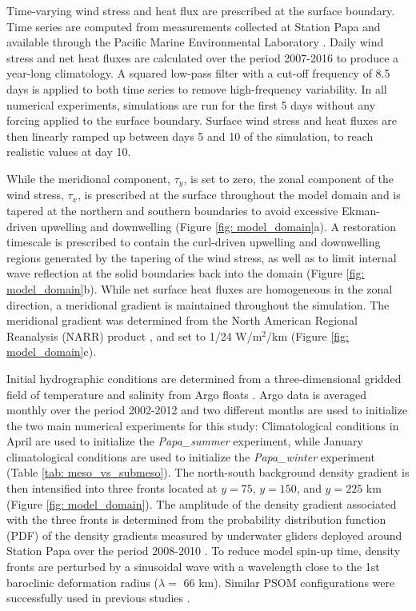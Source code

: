 \documentclass[article,linenumbers]{agujournal2018}
\begin{document}
Time-varying wind stress and heat flux are prescribed at the surface boundary. Time series are computed from measurements collected at Station Papa and available through the Pacific Marine Environmental Laboratory \citep{PMEL_data}. Daily wind stress and net heat fluxes are calculated over the period 2007-2016 to produce a year-long climatology. A squared low-pass filter with a cut-off frequency of 8.5 days is applied to both time series to remove high-frequency variability. In all numerical experiments, simulations are 
run for the first 5 days without any forcing applied to the surface boundary. Surface wind stress and heat fluxes are then linearly ramped up between days 5 and 10 of the simulation, to reach realistic values at day 10.

While the meridional component, $\tau_y$, is set to zero, the zonal component of the wind stress, $\tau_x$, is prescribed at the surface throughout the model domain and is tapered at the northern and southern boundaries to avoid excessive Ekman-driven upwelling and downwelling (Figure \ref{fig: model_domain}a). A restoration timescale is prescribed to contain the curl-driven upwelling and downwelling regions generated by the tapering of the wind stress, as well as to limit internal wave reflection at the solid boundaries back into the domain (Figure \ref{fig: model_domain}b). While net surface heat fluxes are homogeneous in the zonal direction, a meridional gradient is maintained throughout the simulation. The meridional gradient was determined from the North American Regional Reanalysis (NARR) product \citep{Mesinger_2006}, and set to 1/24 W/m$^2$/km (Figure \ref{fig: model_domain}c).

Initial hydrographic conditions are determined from a three-dimensional gridded field of temperature and salinity from Argo floats \citep{Gaillard_2015,Gaillard_2016}. Argo data is averaged monthly over the period 2002-2012 and two different months are used to initialize the two main numerical experiments for this study: Climatological conditions in April are used to initialize the \textit{Papa\_summer} experiment, while January climatological conditions are used to initialize the \textit{Papa\_winter} experiment (Table \ref{tab: meso_vs_submeso}). The north-south background density gradient is then intensified into three fronts located at $y = 75$, $y = 150$, and $y = 225$ km (Figure \ref{fig: model_domain}). The amplitude of the density gradient associated with the three fronts is determined from the probability distribution function (PDF) of the density gradients measured by underwater gliders deployed around Station Papa over the period 2008-2010 \citep{Pelland_2016,Pelland_2018_data}. To reduce model spin-up time, density fronts are perturbed by a sinusoidal wave with a wavelength close to the 1st baroclinic deformation radius ($\lambda = $ 66 km). Similar PSOM configurations were successfully used in previous studies \citep{Mahadevan_2012,Omand_2015}.
\end{document}
